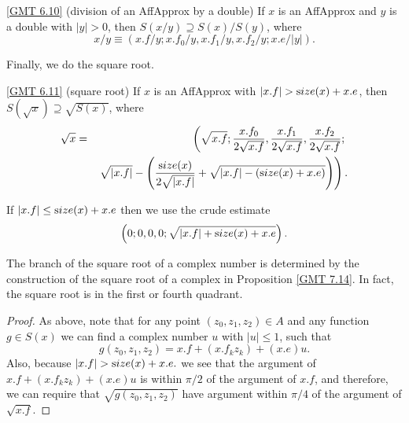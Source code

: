 {\begin{proposition}{\ref{GMT 6.10} {\textrm (division of an AffApprox by a double)}} If $x$ is an {\textrm AffApprox}  and $y$ is a double
with $|y| > 0${\textrm ,} then $S(x / y) \supseteq S(x) / S(y)${\textrm ,} where
$$
x / y \equiv (x.f / y; x.f_0 / y, 
x.f_1 / y, x.f_2 / y; 
x.e/ |y| ).
$$
\end{proposition}

Finally, we do the square root.

\begin{proposition}{\ref{GMT 6.11} {\textrm (square root)}} If $x$ is an {\textrm AffApprox}  with $|x.f| > {\textrm size}(x) + x.e${\textrm ,}
 then $S(\sqrt x)
\supseteq
\sqrt {S(x)}${\textrm ,} where
\begin{eqnarray*}
\sqrt x& = &\left(\sqrt {x.f}; 
 {x.f_0 \over 2 \sqrt {x.f}}, 
 {x.f_1 \over 2 \sqrt {x.f}}, 
 {x.f_2 \over 2 \sqrt {x.f}};
\right.\\
&& \left. \sqrt {|x.f|} - \left({{\textrm size}(x) \over 2 \sqrt {|x.f|}} + \sqrt {|x.f| - ({\textrm size}(x) + x.e)}\right)
                                              \right).
\end{eqnarray*}
\end{proposition} 
If $|x.f| \le {\textrm size}(x) + x.e$ then we use the crude estimate $$\left(0;0,0,0;\sqrt{|x.f| + {\textrm size}(x) + x.e}\right).$$
 
The branch of the square root of a complex number is determined by the construction of the square root of a complex in Proposition \ref{GMT 7.14}.  In fact, the square root is in the first or fourth quadrant.

\begin{proof}{} 
As above, note that for any point $(z_0, z_1, z_2) \in A$ and any function $g \in S(x)$ we can find a complex number $u$ with 
$|u|   \le 1$, such that
$$ g(z_0, z_1, z_2) = x.f + (x.f_k z_k) + (x.e) u.$$
Also, because $|x.f| > {\textrm size}(x) + x.e.$ we see that the argument of
$x.f + (x.f_k z_k) + (x.e) u$ is within $\pi/2$ of the argument of 
$x.f$, and therefore, we can require that $\sqrt{g(z_0,z_1,z_2)}$ have argument within $\pi/4$ of the argument of $\sqrt{x.f}.$


\end{proof}}
